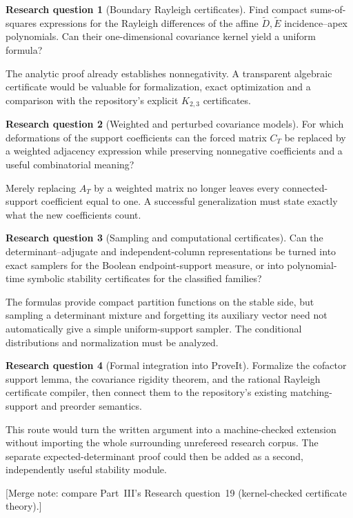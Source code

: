 \documentclass[11pt]{article}
\numberwithin{equation}{section}
\theoremstyle{definition}
\newtheorem{question}{Research question}%
\begin{document}
\begin{question}[Boundary Rayleigh certificates]
Find compact sums-of-squares expressions for the Rayleigh differences
of the affine $\widetilde D,\widetilde E$ incidence--apex polynomials.
Can their one-dimensional covariance kernel yield a uniform formula?
\end{question}
The analytic proof already establishes nonnegativity.  A transparent
algebraic certificate would be valuable for formalization, exact
optimization and a comparison with the repository's explicit $K_{2,3}$
certificates.

\begin{question}[Weighted and perturbed covariance models]
For which deformations of the support coefficients can the forced matrix
$C_T$ be replaced by a weighted adjacency expression while preserving
nonnegative coefficients and a useful combinatorial meaning?
\end{question}
Merely replacing $A_T$ by a weighted matrix no longer leaves every
connected-support coefficient equal to one.  A successful generalization
must state exactly what the new coefficients count.

\begin{question}[Sampling and computational certificates]
Can the determinant--adjugate and independent-column representations be
turned into exact samplers for the Boolean endpoint-support measure, or
into polynomial-time symbolic stability certificates for the classified
families?
\end{question}
The formulas provide compact partition functions on the stable side,
but sampling a determinant mixture and forgetting its auxiliary vector
need not automatically give a simple uniform-support sampler.  The
conditional distributions and normalization must be analyzed.

\begin{question}[Formal integration into ProveIt]\label{mts:hq:formal}
Formalize the cofactor support lemma, the covariance rigidity theorem,
and the rational Rayleigh certificate compiler, then connect them to the
repository's existing matching-support and preorder semantics.
\end{question}
This route would turn the written argument into a machine-checked
extension without importing the whole surrounding unrefereed research
corpus.  The separate expected-determinant proof could then be added as a
second, independently useful stability module.

[Merge note: compare Part~III's Research question~19 (kernel-checked
certificate theory).]
\end{document}

